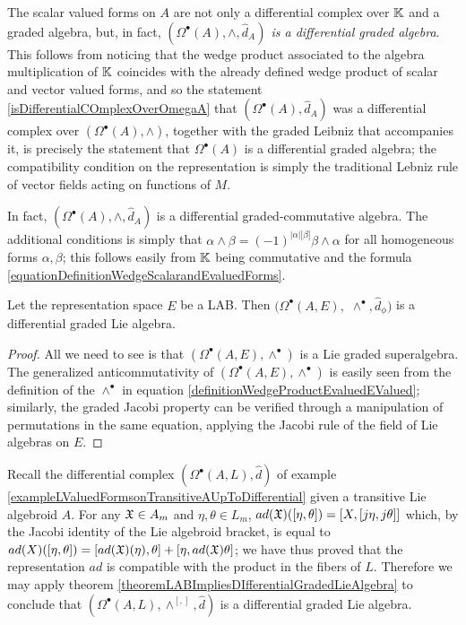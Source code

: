 \begin{example}
The scalar valued forms on $A$ are not only a differential complex over $\mathbb{K}$ and a graded algebra, but, in fact, \textit{$(\Omega^\bullet(A), \wedge, \hat d_A)$ is a differential graded algebra}. This follows from noticing that the wedge product associated to the algebra multiplication of $\mathbb{K}$ coincides with the already defined wedge product of scalar and vector valued forms, and so the statement \ref{isDifferentialCOmplexOverOmegaA} that $(\Omega^\bullet(A), \hat d_A)$ was a differential complex over $(\Omega^\bullet(A), \wedge)$, together with the graded Leibniz that accompanies it, is precisely the statement that $\Omega^\bullet(A)$ is a differential graded algebra; the compatibility condition on the representation is simply the traditional Lebniz rule of vector fields acting on functions of $M$.

In fact, $(\Omega^\bullet(A), \wedge, \hat d_A)$ is a differential graded-commutative algebra. The additional conditions is simply that $\alpha \wedge \beta = (-1)^{|\alpha||\beta|}\beta \wedge \alpha$ for all homogeneous forms $\alpha, \beta$; this follows easily from $\mathbb{K}$ being commutative and the formula \eqref{equationDefinitionWedgeScalarandEvaluedForms}.
\end{example}

\begin{theorem}\label{theoremLABImpliesDIfferentialGradedLieAlgebra}
Let the representation space $E$ be a LAB. Then $(\Omega^\bullet(A, E),$ $\wedge^\bullet, \hat d_\phi)$ is a differential graded Lie algebra.
\end{theorem}
\begin{proof}
All we need to see is that $(\Omega^\bullet(A, E), \wedge^\bullet)$ is a Lie graded superalgebra. The generalized anticommutativity of $(\Omega^\bullet(A, E), \wedge^\bullet)$ is easily seen from the definition of the $\wedge^\bullet$ in equation \eqref{definitionWedgeProductEvaluedEValued}; similarly, the graded Jacobi property can be verified through a manipulation of permutations in the same equation, applying the Jacobi rule of the field of Lie algebras on $E$. 
\end{proof}

\begin{example}\label{exampleOmegaALIsDIfferentialGradedLieAlgebra}
Recall the differential complex $(\Omega^\bullet(A, L), \hat d)$ of example \ref{exampleLValuedFormsonTransitiveAUpToDifferential} given a transitive Lie algebroid $A$. For any $\mathfrak{X} \in A_m$ and $\eta, \theta \in L_m$, $ad(\mathfrak{X})([\eta, \theta]) = [X, [j\eta, j\theta]]$ which, by the Jacobi identity of the Lie algebroid bracket, is equal to $ad(X)([\eta, \theta]) = [ad(\mathfrak{X})(\eta), \theta] + [\eta, ad(\mathfrak{X}) \theta]$; we have thus proved that the representation $ad$ is compatible with the product in the fibers of $L$. Therefore we may apply theorem \ref{theoremLABImpliesDIfferentialGradedLieAlgebra} to conclude that $(\Omega^\bullet(A, L), \wedge^{[,]}, \hat d)$ is a differential graded Lie algebra.
\end{example}

